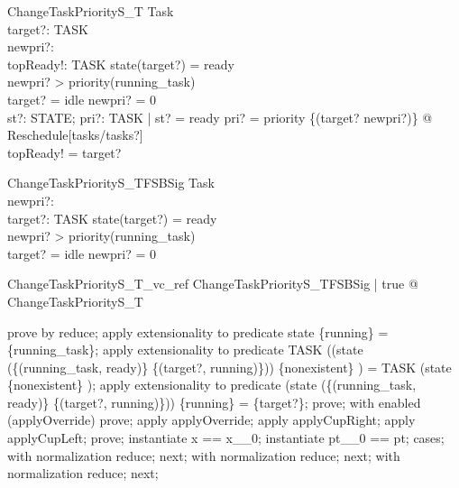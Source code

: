 \documentclass[a4paper, 12pt]{article}
\begin{document}
\begin{schema}{ChangeTaskPriorityS\_T}
  \Delta Task\\
  target?: TASK\\
  newpri?: \nat \\
  topReady!: TASK
\where
  state(target?) = ready\\
  newpri? > priority(running\_task)\\
  target? = idle \implies  newpri? = 0\\
  \exists  st?: STATE; pri?: TASK \fun  \nat  | st? = ready \land  pri? = priority \oplus  \{(target? \mapsto  newpri?)\} @ Reschedule[tasks/tasks?]\\
  topReady! = target?
\end{schema}

\begin{schema}{ChangeTaskPriorityS\_TFSBSig}
  Task\\
  newpri?: \nat \\
  target?: TASK
\where
  state(target?) = ready\\
  newpri? > priority(running\_task)\\
  target? = idle \implies  newpri? = 0
\end{schema}

\begin{theorem}{ChangeTaskPriorityS\_T\_vc\_ref}
\forall  ChangeTaskPriorityS\_TFSBSig | true @ \pre  ChangeTaskPriorityS\_T
\end{theorem}

\begin{zproof}
prove by reduce;
apply extensionality to predicate state \inv  \limg  \{running\} \rimg  = \{running\_task\};
apply extensionality to predicate TASK \setminus  ((state \oplus  (\{(running\_task, ready)\} \cup  \{(target?, running)\})) \inv  \limg  \{nonexistent\} \rimg ) = TASK \setminus  (state \inv  \limg  \{nonexistent\} \rimg );
apply extensionality to predicate (state \oplus  (\{(running\_task, ready)\} \cup  \{(target?, running)\})) \inv  \limg  \{running\} \rimg  = \{target?\};
prove;
with enabled (applyOverride) prove;
apply applyOverride;
apply applyCupRight;
apply applyCupLeft;
prove;
instantiate x == x\_\_0;
instantiate pt\_\_0 == pt;
cases;
with normalization reduce;
next;
with normalization reduce;
next;
with normalization reduce;
next;
\end{zproof}
\end{document}
